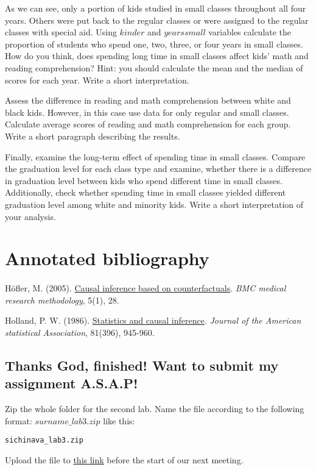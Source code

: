 \documentclass{article}\usepackage[]{graphicx}\usepackage[]{color}
\makeatletter
\newcommand{\hlstd}[1]{\textcolor[rgb]{0.345,0.345,0.345}{#1}}%
\newenvironment{kframe}{%
 \def\at@end@of@kframe{}%
 \ifinner\ifhmode%
  \def\at@end@of@kframe{\end{minipage}}%
  \begin{minipage}{\columnwidth}%
 \fi\fi%
 \def\FrameCommand##1{\hskip\@totalleftmargin \hskip-\fboxsep
 \colorbox{shadecolor}{##1}\hskip-\fboxsep
     \hskip-\linewidth \hskip-\@totalleftmargin \hskip\columnwidth}%
 \MakeFramed {\advance\hsize-\width
   \@totalleftmargin\z@ \linewidth\hsize
   \@setminipage}}%
 {\par\unskip\endMakeFramed%
 \at@end@of@kframe}
\newenvironment{knitrout}{}{} %
\makeatother
\begin{document}
As we can see, only a portion of kids studied in small classes throughout all four years. Others were put back to the regular classes or were assigned to the regular classes with special aid. Using $kinder$ and $yearssmall$ variables calculate the proportion of students who spend one, two, three, or four years in small classes. How do you think, does spending long time in small classes affect kids' math and reading comprehension? Hint: you should calculate the mean and the median of scores for each year. Write a short interpretation.

Assess the difference in reading and math comprehension between white and black kids. However, in this case use data for only regular and small classes. Calculate average scores of reading and math comprehension for each group. Write a short paragraph describing the results.

Finally, examine the long-term effect of spending time in small classes. Compare the graduation level for each class type and examine, whether there is a difference in graduation level between kids who spend different time in small classes. Additionally, check whether spending time in small classes yielded different graduation level among white and minority kids. Write a short interpretation of your analysis.


\section*{Annotated bibliography}
\paragraph{}

Höfler, M. (2005). \href{https://www.dropbox.com/s/7qo4c0g85xw0zer/Hoefler2005.pdf?dl=0}{Causal inference based on counterfactuals}. \emph{BMC medical research methodology}, 5(1), 28.

Holland, P. W. (1986). \href{https://www.dropbox.com/s/8dza8acflt1ige4/Holland1986.pdf?dl=0}{Statistics and causal inference}. \emph{Journal of the American statistical Association}, 81(396), 945-960.



\subsection*{Thanks God, finished! Want to submit my assignment A.S.A.P!}

Zip the whole folder for the second lab. Name the file according to the following format: $surname\_lab3.zip$ like this:

\begin{knitrout}
\color{fgcolor}\begin{kframe}
\begin{alltt}
\hlstd{sichinava_lab3.zip}
\end{alltt}
\end{kframe}
\end{knitrout}

Upload the file to \href{https://www.dropbox.com/request/sR0YYr1utGRwXEal9Hq5}{this link} before the start of our next meeting.
\end{document}
